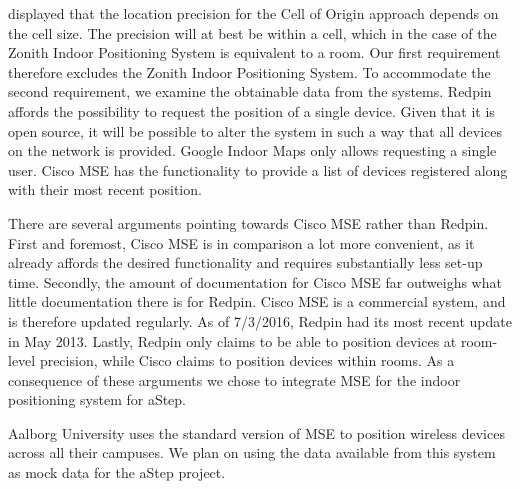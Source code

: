  displayed that the location precision for the Cell of Origin approach depends on the cell size. The precision will at best be within a cell, which in the case of the Zonith Indoor Positioning System is equivalent to a room. Our first requirement therefore excludes the Zonith Indoor Positioning System. To accommodate the second requirement, we examine the obtainable data from the systems. Redpin affords the possibility to request the position of a single device. Given that it is open source, it will be possible to alter the system in such a way that all devices on the network is provided. Google Indoor Maps only allows requesting a single user. Cisco MSE has the functionality to provide a list of devices registered along with their most recent position.

There are several arguments pointing towards Cisco MSE rather than Redpin. First and foremost, Cisco MSE is in comparison a lot more convenient, as it already affords the desired functionality and requires substantially less set-up time. Secondly, the amount of documentation for Cisco MSE far outweighs what little documentation there is for Redpin. Cisco MSE is a commercial system, and is therefore updated regularly. As of 7/3/2016, Redpin had its most recent update in May 2013. Lastly, Redpin only claims to be able to position devices at room-level precision, while Cisco claims to position devices within rooms. As a consequence of these arguments we chose to integrate MSE for the indoor positioning system for aStep.

Aalborg University uses the standard version of MSE to position wireless devices across all their campuses. We plan on using the data available from this system as mock data for the aStep project.